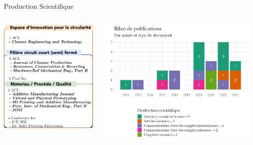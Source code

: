 \documentclass[
  11pt,
  ignorenonframetext,
  aspectratio=169,
  c]{beamer}
\begin{document}
\begin{frame}{Production Scientifique}
\protect\hypertarget{production-scientifique}{}
\begin{columns}[T]
\begin{column}[c]{0.3\textwidth}
\includegraphics{Figures/slides/Journals/Journals.png}
\end{column}

\begin{column}[c]{0.58\textwidth}
\includegraphics{Figures/slides/Fabio-Articles.jpg}
\end{column}
\end{columns}
\end{frame}
\end{document}
